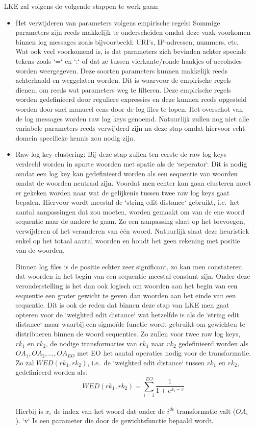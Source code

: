 LKE zal volgens de volgende stappen te werk gaan:
\begin{itemize}
    \item Het verwijderen van parameters volgens empirische regels: Sommige parameters zijn reeds makkelijk te onderscheiden omdat deze vaak voorkomen binnen log messages zoals bijvoorbeeld: URI's, IP-adressen, nummers, etc. Wat ook veel voorkomend is, is dat parameters zich bevinden achter speciale tekens zoals `=` en `:` of dat ze tussen vierkante/ronde haakjes of accolades worden weergegeven. Deze soorten parameters kunnen makkelijk reeds achterhaald en weggelaten worden. Dit is waarvoor de empirische regels dienen, om reeds wat parameters weg te filteren. Deze empirische regels worden gedefinieerd door reguliere expressies en deze kunnen reeds opgesteld worden door snel manueel eens door de log files te lopen. Het overschot van de log messages worden raw log keys genoemd. Natuurlijk zullen nog niet alle variabele parameters reeds verwijderd zijn na deze stap omdat hiervoor echt domein specifieke kennis zou nodig zijn.\\
    \item Raw log key clustering: Bij deze stap zullen ten eerste de raw log keys verdeeld worden in aparte woorden met spatie als de `seperator`. Dit is nodig omdat een log key kan gedefinieerd worden als een sequentie van woorden omdat de woorden neutraal zijn. Voordat men echter kan gaan clusteren moet er gekeken worden naar wat de gelijkenis tussen twee raw log keys gaat bepalen. Hiervoor wordt meestal de `string edit distance` gebruikt, i.e.\ het aantal aanpassingen dat zou moeten, worden gemaakt om van de ene woord sequentie naar de andere te gaan. Zo een aanpassing slaat op het toevoegen, verwijderen of het veranderen van één woord. Natuurlijk slaat deze heuristiek enkel op het totaal aantal woorden en houdt het geen rekening met positie van de woorden. 
    
    Binnen log files is de positie echter zeer significant, zo kan men constateren dat woorden in het begin van een sequentie meestal constant zijn. Onder deze veronderstelling is het dan ook logisch om woorden aan het begin van een sequentie een groter gewicht te geven dan woorden aan het einde van een sequentie. Dit is ook de reden dat binnen deze stap van LKE men gaat opteren voor de `weighted edit distance` wat hetzelfde is als de `string edit distance` maar waarbij een sigmoïde functie wordt gebruikt om gewichten te distribueren binnen de woord sequenties. Zo zullen voor twee raw log keys, \(rk_{1}\) en \(rk_{2}\), de nodige transformaties van \(rk_{1}\) naar \(rk_{2}\) gedefinieerd worden als \(OA_{1}, OA_{2}, ..., OA_{EO}\) met EO het aantal operaties nodig voor de transformatie. Zo zal \(WED(rk_{1}, rk_{2})\), i.e.\ de `weighted edit distance` tussen \(rk_{1}\) en \(rk_{2}\), gedefinieerd worden als:
    \[ WED(rk_{1}, rk_{2}) = \sum_{i=1}^{EO} \frac{1}{1+e^{x_{i}-v}} \]\\
    Hierbij is \(x_{i}\) de index van het woord dat onder de \(i^{de}\) transformatie valt (\(OA_{i}\)). `v` Is een parameter die door de gewichtsfunctie bepaald wordt.
    

\end{itemize}
